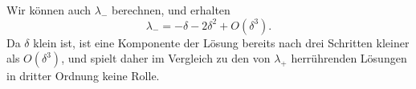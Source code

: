 Wir können auch $\lambda_-$ berechnen, und erhalten
\[
\lambda_-=-\delta-2\delta^2+O(\delta^3).
\]
Da $\delta$ klein ist, ist eine Komponente der Lösung bereits nach
drei Schritten kleiner als $O(\delta^3)$, und spielt daher im Vergleich
zu den von $\lambda_+$ herrührenden Lösungen in dritter Ordnung keine
Rolle.

